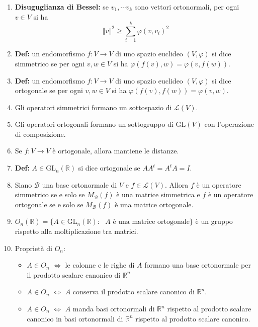 \documentclass[a4paper,11pt]{article}
\newcommand{\norm}[1]{\left\Vert#1\right\Vert}		%
\begin{document}
\begin{enumerate}[resume]
	\item\textbf{Disuguglianza di Bessel:} se $v_1,\cdots v_k$ sono vettori ortonormali, per ogni $v\in V$ si ha \[\norm{v}^2\geq\sum_{i=1}^{k}\varphi(v,v_i)^2\]
	\item\textbf{Def:} un endomorfismo $f\colon V\to V$ di uno spazio euclideo $(V,\varphi)$ si dice simmetrico se per ogni $v,w\in V$ si ha $\varphi(f(v),w)=\varphi(v,f(w))$.
	\item\textbf{Def:} un endomorfismo $f\colon V\to V$ di uno spazio euclideo $(V,\varphi)$ si dice ortogonale se per ogni $v,w\in V$ si ha $\varphi(f(v),f(w))=\varphi(v,w)$.
	\item Gli operatori simmetrici formano un sottospazio di $\mathcal{L}(V)$.
	\item Gli operatori ortogonali formano un sottogruppo di $\textrm{GL}(V)$ con l'operazione di composizione.
	\item Se $f\colon V\to V$ è ortogonale, allora mantiene le distanze.
	\item\textbf{Def:} $A\in\textrm{GL}_n(\mathbb{R})$ si dice ortogonale se $AA^t=A^tA=I$.
	\item Siano $\mathcal{B}$ una base ortonormale di $V$ e $f\in\mathcal{L}(V)$. Allora $f$ è un operatore simmetrico se e solo se $M_\mathcal{B}(f)$ è una matrice simmetrica e $f$ è un operatore ortogonale se e solo se $M_\mathcal{B}(f)$ è una matrice ortogonale.
	\item $O_n(\mathbb{R})=\{A\in\textrm{GL}_n(\mathbb{R}):\textrm{ $A$ è una matrice ortogonale}\}$ è un gruppo rispetto alla moltiplicazione tra matrici.
	\item Proprietà di $O_n$:
	\begin{itemize}
		\item $A\in O_n$ $\Leftrightarrow$ le colonne e le righe di $A$ formano una base ortonormale per il prodotto scalare canonico di $\mathbb{R}^n$
		\item $A\in O_n$ $\Leftrightarrow$ $A$ conserva il prodotto scalare canonico di $\mathbb{R}^n$.
		\item $A\in O_n$ $\Leftrightarrow$ $A$ manda basi ortonormali di $\mathbb{R}^n$ rispetto al prodotto scalare canonico in basi ortonormali di $\mathbb{R}^n$ rispetto al prodotto scalare canonico.
	\end{itemize}
\end{enumerate}
\end{document}
